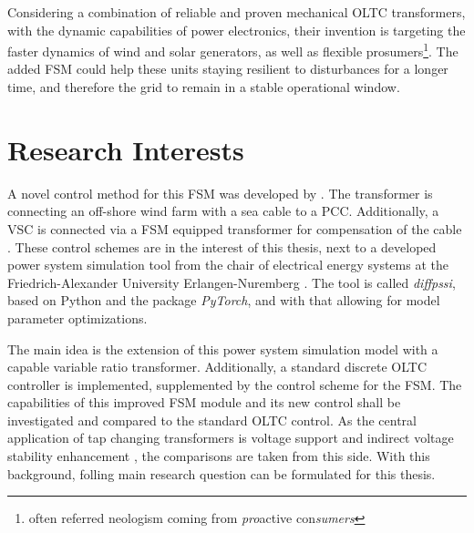 Considering a combination of reliable and proven mechanical \acs{OLTC} transformers, with the dynamic capabilities of power electronics, their invention is targeting the faster dynamics of wind and solar generators, as well as flexible prosumers\footnote{often referred neologism coming from \glqq \textit{pro}active con\textit{sumers}\grqq}.
The added \ac{FSM} could help these units staying resilient to disturbances for a longer time, and therefore the grid to remain in a stable operational window. 

\newpage

\section{Research Interests}
\label{sec:research-interests}

A novel control method for this \acs{FSM} was developed by \cite{burlakin_2024}.
The transformer is connecting an off-shore wind farm with a sea cable to a \ac{PCC}.
Additionally, a \ac{VSC} is connected via a \acs{FSM} equipped transformer for compensation of the cable \autocite{burlakin_2024a}.
These control schemes are in the interest of this thesis, next to a developed power system simulation tool from the chair of electrical energy systems at the Friedrich-Alexander University Erlangen-Nuremberg \autocite{kordowich_2023}.
The tool is called \textit{diffpssi}, based on Python and the package \textit{PyTorch}, and with that allowing for model parameter optimizations.

The main idea is the extension of this power system simulation model with a capable variable ratio transformer.
Additionally, a standard discrete \acs{OLTC} controller is implemented, supplemented by the control scheme for the \acs{FSM}.
The capabilities of this improved \acs{FSM} module and its new control shall be investigated and compared to the standard \acs{OLTC} control.
As the central application of tap changing transformers is voltage support and indirect voltage stability enhancement \autocite{kundur_2022,milano_2010}, the comparisons are taken from this side.
With this background, folling main research question can be formulated for this thesis.


